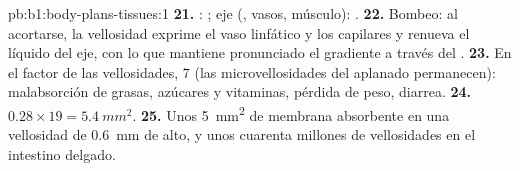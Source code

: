 \begin{solution}{pb:b1:body-plans-tissues:1}
\textbf{21.} : ; eje (, vasos, músculo):
.
\textbf{22.} Bombeo: al acortarse, la vellosidad exprime el vaso linfático y
los capilares y renueva el líquido del eje, con lo que mantiene pronunciado
el gradiente a través del .
\textbf{23.} En el factor de las vellosidades, $7$ (las microvellosidades
del  aplanado permanecen): malabsorción de grasas, azúcares y
vitaminas, pérdida de peso, diarrea.
\textbf{24.} $0.28\times 19 = \qty{5.4}{mm^2}$.
\textbf{25.} Unos \qty{5}{mm^2} de membrana absorbente en una vellosidad de
\qty{0.6}{mm} de alto, y unos cuarenta millones de vellosidades en el
intestino delgado.
\end{solution}
